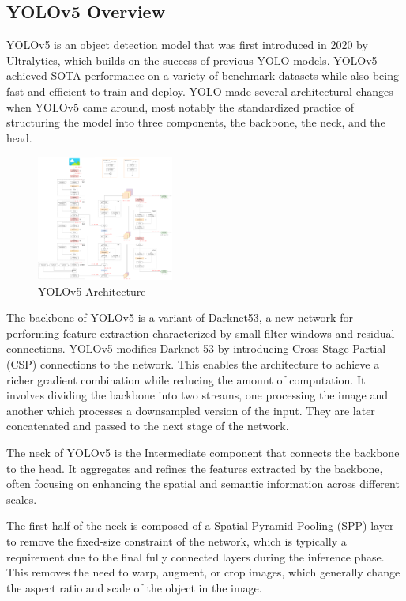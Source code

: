\documentclass[10pt,twocolumn,letterpaper]{article}
\begin{document}
\subsection{YOLOv5 Overview}

YOLOv5 is an object detection model that was first introduced in 2020 by Ultralytics, which builds on the success of previous YOLO models. YOLOv5 achieved SOTA performance on a variety of benchmark datasets while also being fast and efficient to train and deploy. YOLO made several architectural changes when YOLOv5 came around, most notably the standardized practice of structuring the model into three components, the backbone, the neck, and the head. 

\begin{figure}[h]
    \centering
    \includegraphics[width=0.4\textwidth]{figures/YOLOv5_arch.png}
    \caption{YOLOv5 Architecture}
    \label{fig:my_label}
\end{figure}

The backbone of YOLOv5 is a variant of Darknet53, a new network for performing feature extraction characterized by small filter windows and residual connections. YOLOv5 modifies Darknet 53 by introducing Cross Stage Partial (CSP) connections to the network. This enables the architecture to achieve a richer gradient combination while reducing the amount of computation. It involves dividing the backbone into two streams, one processing the image and another which processes a downsampled version of the input. They are later concatenated and passed to the next stage of the network. 

The neck of YOLOv5 is the Intermediate component that connects the backbone to the head. It aggregates and refines the features extracted by the backbone, often focusing on enhancing the spatial and semantic information across different scales. 

The first half of the neck is composed of a Spatial Pyramid Pooling (SPP) layer to remove the fixed-size constraint of the network, which is typically a requirement due to the final fully connected layers during the inference phase. This removes the need to warp, augment, or crop images, which generally change the aspect ratio and scale of the object in the image. 
\end{document}
